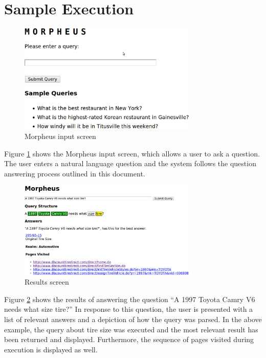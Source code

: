 \section{Sample Execution}

\begin{figure}[t]
\centering
\includegraphics[width=85mm]{screen_intro.eps}
\caption{Morpheus input screen}
\label{fig:screen_intro}
\end{figure}

Figure \ref{fig:screen_intro} shows the Morpheus input screen, which
allows a user to ask a question.  The user enters a natural language
question and the system follows the question answering process outlined
in this document.

\begin{figure}[t]
\centering
\includegraphics[width=85mm]{screen_result.eps}
\caption{Results screen}
\label{fig:screen_result}
\end{figure}


Figure \ref{fig:screen_result} shows the results of answering the question ``A 1997 Toyota Camry V6 needs what size tire?''
In response to this question, the user is presented with a list of relevant answers and a depiction of how the query was parsed. In the above example, the query about tire size was executed and the most relevant result has been returned and displayed. 
Furthermore, the sequence of pages visited during execution is displayed as well. 

